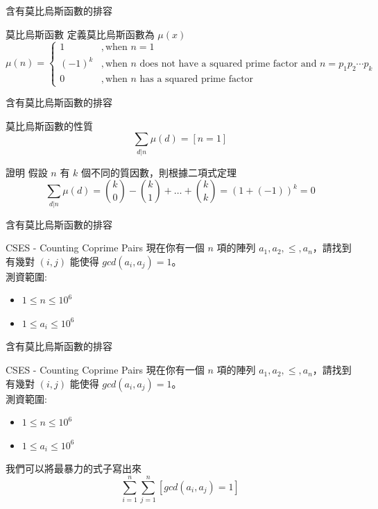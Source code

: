 \documentclass[aspectratio=169]{beamer}
\begin{document}
\begin{frame}{含有莫比烏斯函數的排容}
    \begin{alertblock}{莫比烏斯函數}
        定義莫比烏斯函數為 $\mu(x)$
        $$\mu(n) = \begin{cases} 1&, \text{when } n = 1\\(-1)^k &,\text{when } n \text{ does not have a squared prime factor and } n = p_1p_2\cdots p_k \\ 0 & ,\text{when } n \text{ has a squared prime factor}\end{cases}$$
    \end{alertblock}
\end{frame}

\begin{frame}{含有莫比烏斯函數的排容}
    \begin{alertblock}{莫比烏斯函數的性質}
        $$\displaystyle \sum_{d|n} \mu(d) = [n=1]$$ 
    \end{alertblock} \pause
    \begin{block}{證明}
        假設 $n$ 有 $k$ 個不同的質因數，則根據二項式定理
        $$\sum_{d|n} \mu(d) = \binom{k}{0} - \binom{k}{1} + \dots + \binom{k}{k} = (1+(-1))^k = 0$$
    \end{block}
\end{frame}

\begin{frame}{含有莫比烏斯函數的排容}
    \begin{block}{CSES - Counting Coprime Pairs}
        現在你有一個 $n$ 項的陣列 $a_1, a_2, \le, a_n$，請找到有幾對 $(i,j)$ 能使得 $gcd(a_i,a_j)=1$。 \\
        \vspace{5mm}
        測資範圍:
        \begin{itemize}
            \item $1 \le n \le 10^6$
            \item $1 \le a_i \le 10^6$
        \end{itemize}
    \end{block}
\end{frame}

\begin{frame}{含有莫比烏斯函數的排容}
    \begin{block}{CSES - Counting Coprime Pairs}
        現在你有一個 $n$ 項的陣列 $a_1, a_2, \le, a_n$，請找到有幾對 $(i,j)$ 能使得 $gcd(a_i,a_j)=1$。 \\
        \vspace{5mm}
        測資範圍:
        \begin{itemize}
            \item $1 \le n \le 10^6$
            \item $1 \le a_i \le 10^6$
        \end{itemize}
    \end{block}
    我們可以將最暴力的式子寫出來
    $$\sum_{i=1}^n \sum_{j=1}^n [gcd(a_i,a_j)=1]$$
\end{frame}
\end{document}
